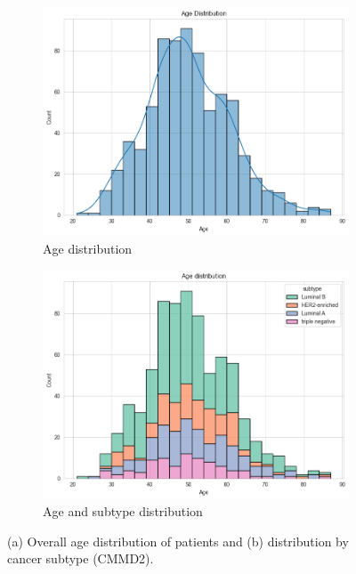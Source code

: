 \documentclass[a4paper,10pt]{book}
\begin{document}
\begin{figure}[h!]
	\centering
	\begin{subfigure}[c]{0.49\textwidth}
		\centering
		\includegraphics[width=\textwidth]{reports//assets/age.png}
		\caption{Age distribution}
		\label{fig:age_dist}
	\end{subfigure}
	\begin{subfigure}[c]{0.49\textwidth}
		\centering
		\includegraphics[width=\textwidth]{reports/assets/age_subtype.png}
		\caption{Age and subtype distribution}
		\label{fig:age_subtype}
	\end{subfigure}
	\caption[CMMD2 Age distribution]{(a) Overall age distribution of patients and (b) distribution by cancer subtype (CMMD2).}
	\label{fig:age_dist_all}
\end{figure}
\end{document}
